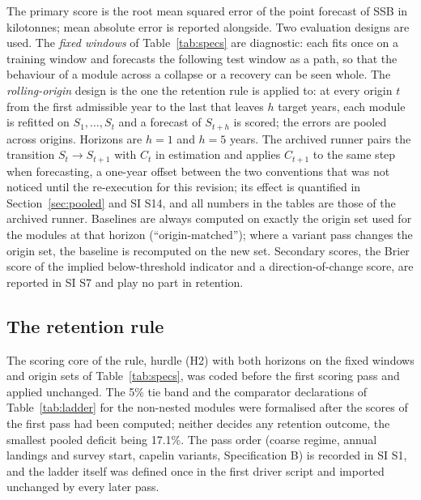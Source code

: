 The primary score is the root mean squared error of the point forecast of SSB in kilotonnes; mean absolute error is reported alongside. Two evaluation designs are used. The \emph{fixed windows} of Table~\ref{tab:specs} are diagnostic: each fits once on a training window and forecasts the following test window as a path, so that the behaviour of a module across a collapse or a recovery can be seen whole. The \emph{rolling-origin} design \citep{Tashman2000} is the one the retention rule is applied to: at every origin $t$ from the first admissible year to the last that leaves $h$ target years, each module is refitted on $S_1,\dots,S_t$ and a forecast of $S_{t+h}$ is scored; the errors are pooled across origins. Horizons are $h=1$ and $h=5$ years. The archived runner pairs the transition $S_t\to S_{t+1}$ with $C_t$ in estimation and applies $C_{t+1}$ to the same step when forecasting, a one-year offset between the two conventions that was not noticed until the re-execution for this revision; its effect is quantified in Section~\ref{sec:pooled} and SI S14, and all numbers in the tables are those of the archived runner. Baselines are always computed on exactly the origin set used for the modules at that horizon (``origin-matched''); where a variant pass changes the origin set, the baseline is recomputed on the new set. Secondary scores, the Brier score of the implied below-threshold indicator and a direction-of-change score, are reported in SI S7 and play no part in retention.

\subsection{The retention rule}\label{sec:rule}

The scoring core of the rule, hurdle (H2) with both horizons on the fixed windows and origin sets of Table~\ref{tab:specs}, was coded before the first scoring pass and applied unchanged. The 5\% tie band and the comparator declarations of Table~\ref{tab:ladder} for the non-nested modules were formalised after the scores of the first pass had been computed; neither decides any retention outcome, the smallest pooled deficit being 17.1\%. The pass order (coarse regime, annual landings and survey start, capelin variants, Specification B) is recorded in SI S1, and the ladder itself was defined once in the first driver script and imported unchanged by every later pass.

